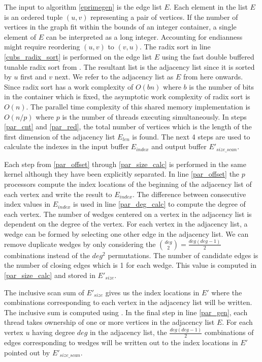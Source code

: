 \documentclass[conference]{IEEEtran}
\begin{document}
The input to algorithm \ref{eprimegen} is the edge list $E$. Each element in the list $E$ is an ordered tuple $(u,v)$ representing a pair of vertices. If the number of vertices in the graph fit within the bounds of an integer container, a single element of $E$ can be interpreted as a long integer. Accounting for endianness might require reordering $(u,v)$ to $(v,u)$. The radix sort in line \ref{cubs_radix_sort} is performed on the edge list $E$ using the fast double buffered tunable radix sort from \cite{b19}. The resultant list is the adjacency list since it is sorted by $u$ first and $v$ next. We refer to the adjacency list as $E$ from here onwards. Since radix sort has a work complexity of $O(bn)$ where $b$ is the number of bits in the container which is fixed, the asymptotic work complexity of radix sort is $O(n)$. The parallel time complexity of this shared memory implementation is $O(n/p)$ where $p$ is the number of threads executing simultaneously. In steps \ref{par_cnt} and \ref{par_red}, the total number of vertices which is the length of the first dimension of the adjacency list $E_{len}$ is found. The next 4 steps are used to calculate the indexes in the input buffer $E_{index}$ and output buffer $E'_{size\_scan}$. 

Each step from \ref{par_offset} through \ref{par_size_calc} is performed in the same kernel although they have been explicitly separated. In line \ref{par_offset} the $p$ processors compute the index locations of the beginning of the adjacency list of each vertex and write the result to $E_{index}$. The difference between consecutive index values in $E_{index}$ is used in line \ref{par_deg_calc} to compute the degree of each vertex. The number of wedges centered on a vertex in the adjacency list is dependent on the degree of the vertex. For each vertex in the adjacency list, a wedge can be formed by selecting one other edge in the adjacency list. We can remove duplicate wedges by only considering the ${deg \choose 2}=\frac{deg(deg-1)}{2}$ combinations instead of the $deg^2$ permutations. The number of candidate edges is the number of closing edges which is 1 for each wedge. This value is computed in \ref{par_size_calc} and stored in $E'_{size}$.

The inclusive scan sum of $E'_{size}$ gives us the index locations in $E'$ where the combinations corresponding to each vertex in the adjacency list will be written. The inclusive sum is computed using \cite{b19}. In the final step in line \ref{par_gen}, each thread takes ownership of one or more vertices in the adjacency list $E$. For each vertex $u$ having degree $deg$ in the adjacency list, the $\frac{deg(deg-1)}{2}$ combinations of edges corresponding to wedges will be written out to the index locations in $E'$ pointed out by $E'_{size\_scan}$.
\end{document}
